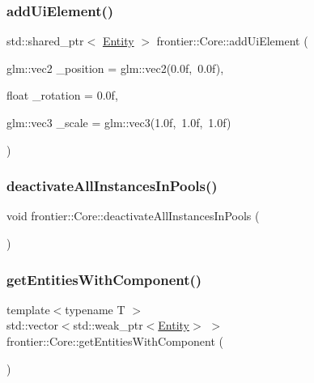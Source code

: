 \mbox{\label{classfrontier_1_1_core_a2386af48e1509dc30a5636968732bf42}} 
\subsubsection{\texorpdfstring{add\+Ui\+Element()}{addUiElement()}}
{\footnotesize\ttfamily std\+::shared\+\_\+ptr$<$ \hyperlink{classfrontier_1_1_entity}{Entity} $>$ frontier\+::\+Core\+::add\+Ui\+Element (\begin{DoxyParamCaption}\item[{glm\+::vec2}]{\+\_\+position = {\ttfamily glm\+:\+:vec2(0.0f,~0.0f)},  }\item[{float}]{\+\_\+rotation = {\ttfamily 0.0f},  }\item[{glm\+::vec3}]{\+\_\+scale = {\ttfamily glm\+:\+:vec3(1.0f,~1.0f,~1.0f)} }\end{DoxyParamCaption})}

\mbox{\label{classfrontier_1_1_core_ac5a33059b33eec0ab216b45aa9772297}} 
\subsubsection{\texorpdfstring{deactivate\+All\+Instances\+In\+Pools()}{deactivateAllInstancesInPools()}}
{\footnotesize\ttfamily void frontier\+::\+Core\+::deactivate\+All\+Instances\+In\+Pools (\begin{DoxyParamCaption}{ }\end{DoxyParamCaption})}

\mbox{\label{classfrontier_1_1_core_a8c42c287ec4a96ff3be194f92e82c367}} 
\subsubsection{\texorpdfstring{get\+Entities\+With\+Component()}{getEntitiesWithComponent()}}
{\footnotesize\ttfamily template$<$typename T $>$ \\
std\+::vector$<$std\+::weak\+\_\+ptr$<$\hyperlink{classfrontier_1_1_entity}{Entity}$>$ $>$ frontier\+::\+Core\+::get\+Entities\+With\+Component (\begin{DoxyParamCaption}{ }\end{DoxyParamCaption})\hspace{0.3cm}{\ttfamily [inline]}}

